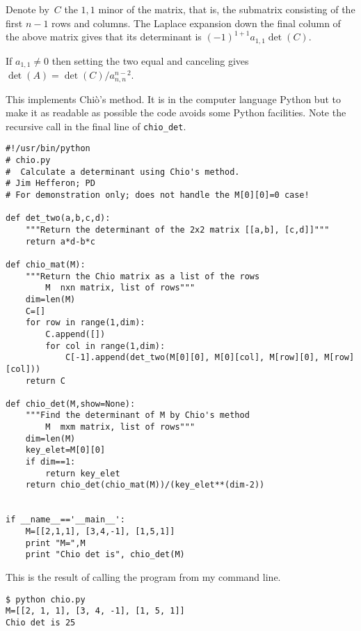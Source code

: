 \begin{exercises}
\begin{answer}
      Denote by~$C$ the $1,1$ minor of the matrix,
      that is, the submatrix consisting of the first $n-1$ rows and columns.
      The Laplace expansion down the final column of the above matrix  
      gives that its determinant is $(-1)^{1+1}a_{1,1}\det(C)$.

      If $a_{1,1}\neq 0$ then setting the two equal and 
      canceling gives $\det(A)=\det(C)/a_{n,n}^{n-2}$.       
    \end{answer}
\end{exercises}

\announcecomputercode
This implements Chi\`o's method.
It is in the computer language Python but to make it as readable as
possible the code avoids some Python facilities.
Note the recursive call in the final line of 
\lstinline!chio_det!. 
\begin{lstlisting}
#!/usr/bin/python
# chio.py
#  Calculate a determinant using Chio's method.
# Jim Hefferon; PD
# For demonstration only; does not handle the M[0][0]=0 case!

def det_two(a,b,c,d):
    """Return the determinant of the 2x2 matrix [[a,b], [c,d]]"""
    return a*d-b*c

def chio_mat(M):
    """Return the Chio matrix as a list of the rows
        M  nxn matrix, list of rows"""
    dim=len(M)
    C=[]
    for row in range(1,dim):
        C.append([])
        for col in range(1,dim):  
            C[-1].append(det_two(M[0][0], M[0][col], M[row][0], M[row][col]))
    return C

def chio_det(M,show=None):
    """Find the determinant of M by Chio's method
        M  mxm matrix, list of rows"""
    dim=len(M)
    key_elet=M[0][0]
    if dim==1:
        return key_elet
    return chio_det(chio_mat(M))/(key_elet**(dim-2))


if __name__=='__main__':
    M=[[2,1,1], [3,4,-1], [1,5,1]]
    print "M=",M
    print "Chio det is", chio_det(M)
\end{lstlisting}
This is the result of calling the program from my command line.
\begin{lstlisting}
$ python chio.py
M=[[2, 1, 1], [3, 4, -1], [1, 5, 1]]
Chio det is 25
\end{lstlisting}
\endinput
